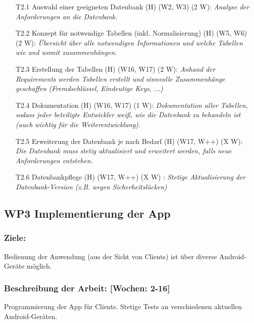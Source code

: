 \documentclass{report}
\begin{document}
\begin{enumerate}
\item [T2.1] Auswahl einer geeigneten Datenbank (H) (W2, W3) (2 W): \emph{ Analyse der Anforderungen an die Datenbank.}
\item [T2.2] Konzept für notwendige Tabellen (inkl. Normalisierung) (H) (W5, W6) (2 W): \emph{ Übersicht über alle notwendigen Informationen und welche Tabellen wie und womit zusammenhängen.}
\item [T2.3] Erstellung der Tabellen (H) (W16, W17) (2 W): \emph{ Anhand der Requirements werden Tabellen erstellt und sinnvolle Zusammenhänge geschaffen (Fremdschlüssel, Eindeutige Keys, ...)}
\item [T2.4] Dokumentation (H) (W16, W17) (1 W): \emph{ Dokumentation aller Tabellen, sodass jeder beteiligte Entwickler weiß, wie die Datenbank zu behandeln ist (auch wichtig für die Weiterentwicklung).}
\item [T2.5] Erweiterung der Datenbank je nach Bedarf (H) (W17, W++) (X W): \emph{ Die Datenbank muss stetig aktualisiert und erweitert werden, falls neue Anforderungen entstehen.}
\item [T2.6] Datenbankpflege (H) (W17, W++) (X W) : \emph{ Stetige Aktualisierung der Datenbank-Version (z.B. wegen Sicherheitslücken)}
\end{enumerate}

\subsection*{WP3 Implementierung der App}

\subsubsection{Ziele:} Bedienung der Anwendung (aus der Sicht von Clients) ist über diverse Android-Geräte möglich.
\subsubsection{Beschreibung der Arbeit: [Wochen: 2-16]} Programmierung der App für Clients. Stetige Tests an verschiedenen aktuellen Android-Geräten.
\end{document}
